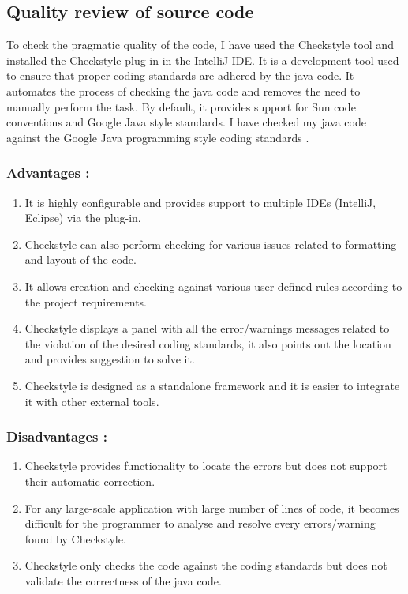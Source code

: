 \documentclass[12pt, a4paper]{article}
\begin{document}
\newpage
\subsection{Quality review of source code}
To check the pragmatic quality of the code, I have used the Checkstyle tool and installed the Checkstyle plug-in in the IntelliJ IDE. It is a development tool used to ensure that proper coding standards are adhered by the java code. It automates the process of checking the java code and removes the need to manually perform the task. By default, it provides support for Sun code conventions and Google Java style standards. I have checked my java code against the Google Java programming style coding standards \cite{Checkstyle} .

\subsubsection{Advantages : }
\begin{enumerate}
    \item It is highly configurable and provides support to multiple IDEs (IntelliJ, Eclipse) via the plug-in.
    \item Checkstyle can also perform checking for various issues related to formatting and layout of the code.
    \item It allows creation and checking against various user-defined rules according to the project requirements.
    \item Checkstyle displays a panel with all the error/warnings messages related to the violation of the desired coding standards, it also points out the location and provides suggestion to solve it.
    \item Checkstyle is designed as a standalone framework and it is easier to integrate it with other external tools.
\end{enumerate}

\subsubsection{Disadvantages : }
\begin{enumerate}
    \item Checkstyle provides functionality to locate the errors but does not support their automatic correction.
    \item For any large-scale application with large number of lines of code, it becomes difficult for the programmer to analyse and resolve every errors/warning found by Checkstyle.
    \item Checkstyle only checks the code against the coding standards but does not validate the correctness of the java code.
\end{enumerate}
\end{document}
